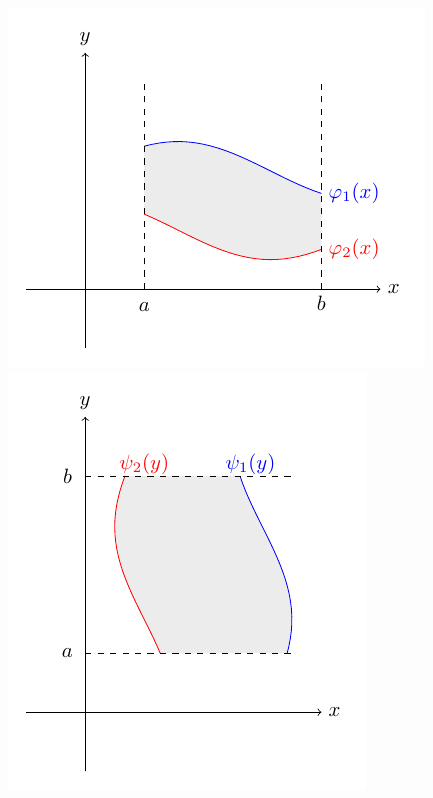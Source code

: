 \begin{figure}[H]
	\centering
	\begin{minipage}{0.49\linewidth}
		\centering
        \includegraphics{figure/p9_1_1.pdf}
        \caption{}
        \label{p9_1_1}
		
	\end{minipage}
	\begin{minipage}{0.49\linewidth}
		\centering
		\includegraphics{figure/p9_1_2.pdf}
        \caption{}
        \label{p9_1_2}
	\end{minipage}
\end{figure}

